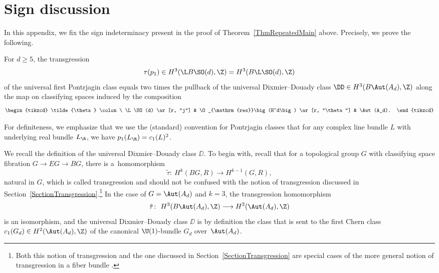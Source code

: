 \appendix

\section{Sign discussion}
\label{AppendixSign}

In this appendix, we fix the sign indeterminacy present in the proof of Theorem~\ref{ThmRepeatedMain} above.
Precisely, we prove the following.

\begin{Proposition}
\label{SignProposition}
For $d\geq 5$, the transgression
\begin{equation*}
\tau(p_1) \in H^3(\L B\SO(d), \Z) = H^3(B\L\SO(d), \Z)
\end{equation*}
of the universal first Pontrjagin class equals two times the pullback of the universal Dixmier--Douady class $\DD \in H^3(B\Aut(A_d), \Z)$ along the map on classifying spaces induced by the composition
\begin{equation*}
\begin{tikzcd}
\tilde{\theta} \colon\ \L\SO(d) \ar[r, "j"] & \O_{\mathrm{res}}\big(H^d\big) \ar[r, "\theta"] & \Aut(A_d).
\end{tikzcd}
\end{equation*}
\end{Proposition}

For definiteness, we emphasize that we use the (standard) convention for Pontrjagin classes that for any complex line bundle $L$ with underlying real bundle $L_\R$, we have $p_1(L_\R) = c_1(L)^2$.

We recall the definition of the universal Dixmier--Douady class $\DD$.
To begin with, recall that for a topological group $G$ with classifying space fibration $G \to EG \to BG$, there is a~homomorphism
\begin{equation*}
 \tilde{\tau} \colon\ H^k(BG, R) \longrightarrow H^{k-1}(G, R),
\end{equation*}
natural in $G$, which is called transgression and should not be confused with the notion of transgression discussed in Section~\ref{SectionTransgression}.\footnote{Both this notion of transgression and the one discussed in Section~\ref{SectionTransgression} are special cases of the more general notion of transgression in a fiber bundle \cite{Borel}.}
In the case of $G = \Aut(A_d)$ and $k=3$, the transgression homomorphism
\begin{equation}
\label{TildeTransgression}
\tilde{\tau} \colon\ H^3(B\Aut(A_d), \Z) \longrightarrow H^2(\Aut(A_d), \Z)	
\end{equation}
is an isomorphism, and the universal Dixmier--Douady class $\DD$ is by definition the class that is sent to the first Chern class $c_1(G_d) \in H^2(\Aut(A_d), \Z)$ of the canonical $\U(1)$-bundle $G_d$ over~$\Aut(A_d)$.





